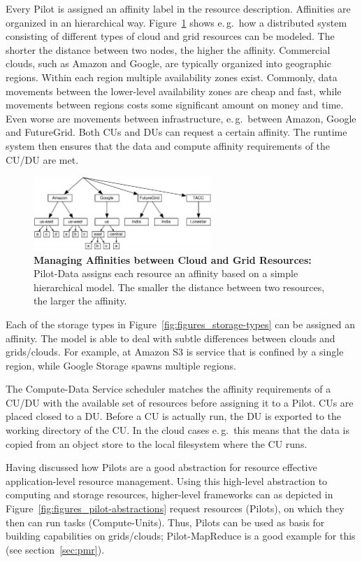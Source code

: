 \documentclass[times]{cpeauth}
\newcommand{\pilot}{Pilot\xspace}
\newcommand{\pilots}{Pilots\xspace}
\newcommand{\pilotdata}{Pilot-Data\xspace}
\newcommand{\computedataservice}{Compute-Data Service\xspace}
\newcommand{\computeunits}{Compute-Units\xspace}
\newcommand{\du}{DU\xspace}
\newcommand{\dus}{DUs\xspace}
\newcommand{\cu}{CU\xspace}
\newcommand{\cus}{CUs\xspace}
\begin{document}
Every \pilot is assigned an affinity label in the resource description.
Affinities are organized in an hierarchical way.
Figure~\ref{fig:figures_affinities} shows e.\,g.\ how a distributed system
consisting of different types of cloud and grid resources can be modeled. The
shorter the distance between two nodes, the higher the affinity. Commercial
clouds, such as Amazon and Google, are typically organized into geographic
regions. Within each region multiple availability zones exist. Commonly, data
movements between the lower-level availability zones are cheap and fast, while
movements between regions costs some significant amount on money and time.
Even worse are movements between infrastructure, e.\,g.\ between Amazon,
Google and FutureGrid. Both \cus and \dus can request a certain affinity. The 
runtime system then ensures that the data and compute affinity requirements of 
the \cu/\du are met.


\begin{figure}[t]
	\centering
		\includegraphics[width=0.6\textwidth]{figures/affinities.pdf}
	\caption{\textbf{Managing Affinities between Cloud and Grid Resources:} 
	\pilotdata assigns each resource an affinity based on a simple 
	hierarchical model. The smaller the distance between two resources, the 
	larger the affinity.}
	\label{fig:figures_affinities}
\end{figure}

Each of the storage types in Figure~\ref{fig:figures_storage-types} can be 
assigned an affinity. The model is able to deal with subtle differences 
between clouds and grids/clouds. For example, at Amazon S3 is service that is 
confined by a single region, while Google Storage spawns multiple regions.

The \computedataservice scheduler matches the affinity requirements of
a \cu/\du with the available set of resources before assigning it to a
\pilot.  \cus are placed closed to a \du. Before a \cu is actually
run, the \du is exported to the working directory of the \cu. In the
cloud cases e.\,g.\ this means that the data is copied from an object
store to the local filesystem where the \cu runs.

Having discussed how \pilots are a good abstraction for resource
effective application-level resource management. Using this high-level
abstraction to computing and storage resources, higher-level
frameworks can as depicted in
Figure~\ref{fig:figures_pilot-abstractions} request resources
(\pilots), on which they then can run tasks (\computeunits). Thus,
\pilots can be used as basis for building capabilities on
grids/clouds; Pilot-MapReduce is a good example for this (see
section~\ref{sec:pmr}).
\end{document}
